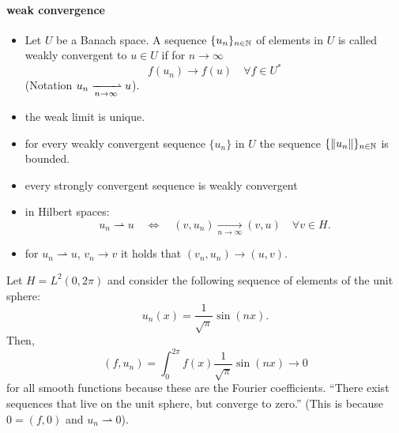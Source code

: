 \documentclass[../skript.tex]{subfiles}
\begin{document}
\paragraph{weak convergence}
\begin{itemize}
\item Let $U$ be a Banach space. A sequence $\{ u_n \}_{n \in \mathbb{N}}$ of elements in $U$ is called weakly convergent to $u \in U$ if for $n \to \infty$
\[
	f(u_n) \to f(u) \quad \forall f \in U^*
\]
(Notation $u_n \xrightharpoonup[n \to \infty]{} u$).
\item the weak limit is unique.
\item for every weakly convergent sequence $\{ u_n \}$ in $U$ the sequence $\{ \| u_n \| \}_{n \in \mathbb{N}}$ is bounded.
\item every strongly convergent sequence is weakly convergent
\item in Hilbert spaces:
\[
	u_n \rightharpoonup u \quad \iff \quad (v, u_n) \xrightarrow[n \to \infty]{} (v, u) \quad \forall v \in H.
\]
\item for $u_n \rightharpoonup u$, $v_n \to v$ it holds that $(v_n, u_n) \to (u, v)$.
\end{itemize}
\begin{example}
Let $H = L^2(0, 2\pi)$ and consider the following sequence of elements of the unit sphere:
\[
	u_n(x) = \frac{1}{\sqrt{\pi}} \sin(nx).
\]
Then,
\[
	(f, u_n) = \int_0^{2\pi} f(x) \frac{1}{\sqrt{\pi}} \sin(nx) \to 0
\]
for all smooth functions because these are the Fourier coefficients.
``There exist sequences that live on the unit sphere, but converge to zero.''
(This is because $0 = (f, 0)$ and $u_n \rightharpoonup 0$).
\end{example}
\end{document}
